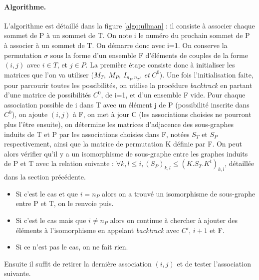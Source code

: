 \paragraph{Algorithme.}
L'algorithme est détaillé dans la figure \ref{algo:ullman} : il consiste à associer chaque sommet de P à un sommet de T. On note i le numéro du prochain sommet de P à associer à un sommet de T. 
On démarre donc avec i=1.
On conserve la permutation $\sigma$ sous la forme d'un ensemble F d'éléments de couples de la forme $(i, j)$ avec $i\in T$, et $j\in P$. 
La première étape consiste donc à initialiser les matrices que l'on va utiliser ($M_T,\ M_P,\ I_{n_P, n_T},\ et\ C^0$). Une fois l'initialisation faite, pour parcourir toutes les possibilités, on utilise la procédure \emph{backtrack} en partant d'une matrice de possibilités $C^0$, de i=1, et d'un ensemble F vide. 
Pour chaque association possible de i dans T avec un élément j de P (possibilité inscrite dans $C^0$), on ajoute $(i, j)$ à F, on met à jour C (les associations choisies ne pourront
plus l'être ensuite), on détermine les matrices d'adjacence des sous-graphes induits de T et P par les associations choisies dans F, notées $S_T$ et $S_P$ respectivement, ainsi que la matrice de permutation K définie par F.
On peut alors vérifier qu'il y a un isomorphisme de sous-graphe entre les graphes induits de P et T avec la relation suivante : $\forall k,l\leq i, (S_P)_{k,l}\leq (K.S_T.K^t)_{k,l}$, détaillée dans la section précédente.
\begin{itemize}
 \item Si c'est le cas et que $i=n_P$ alors on a trouvé un isomorphisme de sous-graphe entre P et T, on le renvoie puis.
 \item Si c'est le cas mais que $i\ne n_P$ alors on continue à chercher à ajouter des éléments à l'isomorphisme en appelant \emph{backtrack} avec $C'$, $i+1$ et F.
 \item Si ce n'est pas le cas, on ne fait rien.
\end{itemize}
Ensuite il suffit de retirer la dernière association $(i, j)$ et de tester l'association suivante. 

